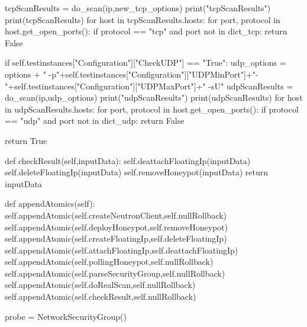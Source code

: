 \begin{python}
			tcpScanResults = do_scan(ip,new_tcp_options)
			print("tcpScanResults")
			print(tcpScanResults)
			for host in tcpScanResults.hosts:
				for port, protocol in host.get_open_ports():
					if protocol == "tcp" and port not in dict_tcp:
						return False


		if self.testinstances["Configuration"]["CheckUDP"] == "True":
			udp_options = options + " -p"+self.testinstances["Configuration"]["UDPMinPort"]+"-"+self.testinstances["Configuration"]["UDPMaxPort"]+" -sU"	
			udpScanResults = do_scan(ip,udp_options)
			print("udpScanResults")
			print(udpScanResults)
			for host in udpScanResults.hosts:
				for port, protocol in host.get_open_ports():
					if protocol == "udp" and port not in dict_udp:
						return False

		return True


	def checkResult(self,inputData):
		self.deattachFloatingIp(inputData)
		self.deleteFloatingIp(inputData)
		self.removeHoneypot(inputData)
		return inputData

	def appendAtomics(self):
		self.appendAtomic(self.createNeutronClient,self.nullRollback)
		self.appendAtomic(self.deployHoneypot,self.removeHoneypot)
		self.appendAtomic(self.createFloatingIp,self.deleteFloatingIp)
		self.appendAtomic(self.attachFloatingIp,self.deattachFloatingIp)
		self.appendAtomic(self.pollingHoneypot,self.nullRollback)
		self.appendAtomic(self.parseSecurityGroup,self.nullRollback)
		self.appendAtomic(self.doRealScan,self.nullRollback)
		self.appendAtomic(self.checkResult,self.nullRollback)

probe = NetworkSecurityGroup()
\end{python}
\label{app:isolamento}
